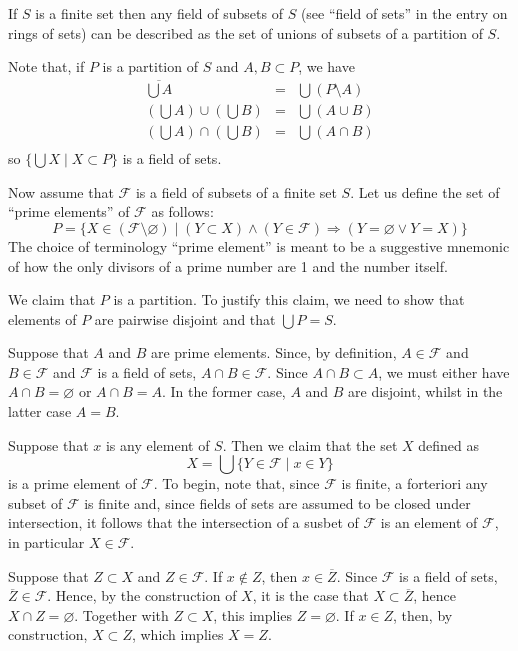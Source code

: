 \documentclass[12pt]{article}
\begin{document}
If $S$ is a finite set then any field of subsets of $S$ (see ``field of 
sets'' in the entry on rings of sets) can be described as the set of unions 
of subsets of a partition of $S$.

Note that, if $P$ is a partition of $S$ and $A,B \subset P$, we
have
\begin{eqnarray*}
\overline{\bigcup A} &=& \bigcup (P \setminus A) \\
(\bigcup A) \cup (\bigcup B) &=& \bigcup (A \cup B) \\
(\bigcup A) \cap (\bigcup B) &=& \bigcup (A \cap B) \\
\end{eqnarray*}
so $\{ \bigcup X \mid X \subset P \}$ is a field of sets.

Now assume that $\mathcal{F}$ is a field of subsets of a finite set
$S$.  Let us define the set of ``prime elements'' of $\mathcal{F}$ as
follows:
 \[P = \{ X \in (\mathcal{F} \setminus {\varnothing}) \mid (Y \subset X)
 \wedge (Y \in \mathcal{F}) \Rightarrow (Y = \varnothing \vee Y = X) \} \]
The choice of terminology ``prime element'' is meant to be a suggestive
mnemonic of how the only divisors of a prime number are 1 and the
number itself.

We claim that $P$ is a partition.  To justify this claim, we need to
show that elements of $P$ are pairwise disjoint and that $\bigcup P =
S$.

Suppose that $A$ and $B$ are prime elements.  Since, by definition, $A
\in \mathcal{F}$ and $B \in \mathcal{F}$ and $\mathcal{F}$ is a field
of sets, $A \cap B \in \mathcal{F}$.  Since $A \cap B \subset A$, we
must either have $A \cap B = \varnothing$ or $A \cap B = A$.  In the
former case, $A$ and $B$ are disjoint, whilst in the latter case $A =
B$.

Suppose that $x$ is any element of $S$.  Then we claim that the set
$X$ defined as 
 \[ X = \bigcup \{ Y \in \mathcal F \mid x \in Y \} \]
is a prime element of $\mathcal{F}$.  To begin, note that, since
$\mathcal{F}$ is finite, a forteriori any subset of $\mathcal{F}$ is
finite and, since fields of sets are assumed to be closed under
intersection, it follows that the intersection of a susbet of
$\mathcal{F}$ is an element of $\mathcal{F}$, in particular $X \in
\mathcal{F}$.  

Suppose that $Z \subset X$ and $Z \in \mathcal{F}$.  If $x \notin Z$,
then $x \in \overline{Z}$.  Since $\mathcal{F}$ is a field of sets,
$\overline{Z} \in \mathcal{F}$.  Hence, by the construction of $X$, it
is the case that $X \subset \overline{Z}$, hence $X \cap Z =
\varnothing$.  Together with $Z \subset X$, this implies $Z =
\varnothing$.  If $x \in Z$, then, by construction, $X \subset Z$,
which implies $X = Z$.  
\end{document}
